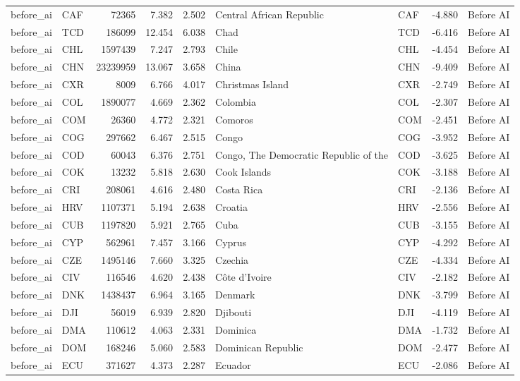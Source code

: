 \begin{tabular}{llrrrllrl}
before\_ai & CAF & 72365 & 7.382 & 2.502 & Central African Republic & CAF & -4.880 & Before AI \\
before\_ai & TCD & 186099 & 12.454 & 6.038 & Chad & TCD & -6.416 & Before AI \\
before\_ai & CHL & 1597439 & 7.247 & 2.793 & Chile & CHL & -4.454 & Before AI \\
before\_ai & CHN & 23239959 & 13.067 & 3.658 & China & CHN & -9.409 & Before AI \\
before\_ai & CXR & 8009 & 6.766 & 4.017 & Christmas Island & CXR & -2.749 & Before AI \\
before\_ai & COL & 1890077 & 4.669 & 2.362 & Colombia & COL & -2.307 & Before AI \\
before\_ai & COM & 26360 & 4.772 & 2.321 & Comoros & COM & -2.451 & Before AI \\
before\_ai & COG & 297662 & 6.467 & 2.515 & Congo & COG & -3.952 & Before AI \\
before\_ai & COD & 60043 & 6.376 & 2.751 & Congo, The Democratic Republic of the & COD & -3.625 & Before AI \\
before\_ai & COK & 13232 & 5.818 & 2.630 & Cook Islands & COK & -3.188 & Before AI \\
before\_ai & CRI & 208061 & 4.616 & 2.480 & Costa Rica & CRI & -2.136 & Before AI \\
before\_ai & HRV & 1107371 & 5.194 & 2.638 & Croatia & HRV & -2.556 & Before AI \\
before\_ai & CUB & 1197820 & 5.921 & 2.765 & Cuba & CUB & -3.155 & Before AI \\
before\_ai & CYP & 562961 & 7.457 & 3.166 & Cyprus & CYP & -4.292 & Before AI \\
before\_ai & CZE & 1495146 & 7.660 & 3.325 & Czechia & CZE & -4.334 & Before AI \\
before\_ai & CIV & 116546 & 4.620 & 2.438 & Côte d'Ivoire & CIV & -2.182 & Before AI \\
before\_ai & DNK & 1438437 & 6.964 & 3.165 & Denmark & DNK & -3.799 & Before AI \\
before\_ai & DJI & 56019 & 6.939 & 2.820 & Djibouti & DJI & -4.119 & Before AI \\
before\_ai & DMA & 110612 & 4.063 & 2.331 & Dominica & DMA & -1.732 & Before AI \\
before\_ai & DOM & 168246 & 5.060 & 2.583 & Dominican Republic & DOM & -2.477 & Before AI \\
before\_ai & ECU & 371627 & 4.373 & 2.287 & Ecuador & ECU & -2.086 & Before AI \\

\end{tabular}
